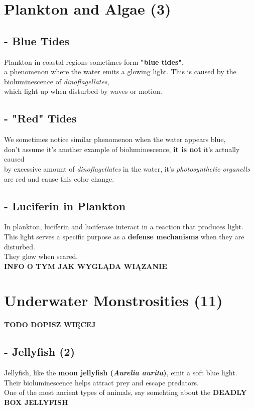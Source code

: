\documentclass{article}
\begin{document}
\section*{Plankton and Algae (3)}

\subsection*{- Blue Tides }
Plankton in coastal regions sometimes form \textbf{"blue tides"},\\ 
a phenomenon where the water emits a glowing light. This is caused by the bioluminescence of \textit{dinoflagellates}, \\
which light up when disturbed by waves or motion.

\subsection*{- "Red" Tides }
We sometimes notice similar phenomenon when the water appears blue,\\
don't assume it's another example of bioluminescence, \textbf{it is not} it's actually caused\\
by excessive amount of \textit{dinoflagellates} in the water, it's \textit{photosynthetic organells} are red and cause this color change.

\subsection*{- Luciferin in Plankton }
In plankton, luciferin and luciferase interact in a reaction that produces light.\\ 
This light serves a specific purpose as a \textbf{defense mechanisms} when they are disturbed.\\
They glow when scared.\\
\textbf{INFO O TYM JAK WYGLĄDA WIĄZANIE}



\section*{Underwater Monstrosities (11)}
\textbf{TODO DOPISZ WIĘCEJ}

\subsection*{- Jellyfish (2)}
Jellyfish, like the \textbf{moon jellyfish (\textit{Aurelia aurita})}, emit a soft blue light.\\ 
Their bioluminescence helps attract prey and escape predators.\\
One of the most ancient types of animals, say somehting about the \textbf{DEADLY BOX JELLYFISH}
\end{document}
